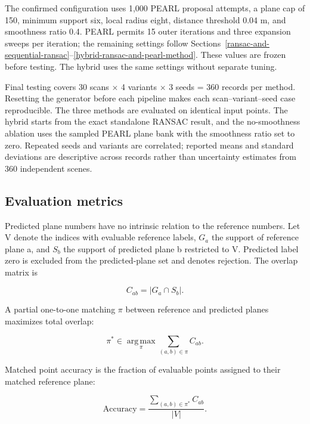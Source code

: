The confirmed configuration uses 1,000 PEARL proposal attempts, a plane cap of 150, minimum support six, local radius eight, distance threshold 0.04 m, and smoothness ratio 0.4. PEARL permits 15 outer iterations and three expansion sweeps per iteration; the remaining settings follow Sections~\ref{ransac-and-sequential-ransac}--\ref{hybrid-ransac-and-pearl-method}. These values are frozen before testing. The hybrid uses the same settings without separate tuning.

Final testing covers 30 scans \(\times\) 4 variants \(\times\) 3 seeds = 360 records per method. Resetting the generator before each pipeline makes each scan--variant--seed case reproducible. The three methods are evaluated on identical input points. The hybrid starts from the exact standalone RANSAC result, and the no-smoothness ablation uses the sampled PEARL plane bank with the smoothness ratio set to zero. Repeated seeds and variants are correlated; reported means and standard deviations are descriptive across records rather than uncertainty estimates from 360 independent scenes.

\subsection{Evaluation metrics}\label{evaluation-metrics}

Predicted plane numbers have no intrinsic relation to the reference numbers. Let V denote the indices with evaluable reference labels, \(G_{a}\) the support of reference plane a, and \(S_{b}\) the support of predicted plane b restricted to V. Predicted label zero is excluded from the predicted-plane set and denotes rejection. The overlap matrix is

\begin{equation}
C_{ab}=|G_a\cap S_b|.
\label{eq:57}
\end{equation}

A partial one-to-one matching \(\pi\) between reference and predicted planes maximizes total overlap:

\begin{equation}
\pi^*\in\operatorname*{arg\,max}_{\pi}\sum_{(a,b)\in\pi}C_{ab}.
\label{eq:58}
\end{equation}

Matched point accuracy is the fraction of evaluable points assigned to their matched reference plane:

\begin{equation}
\mathrm{Accuracy}=\frac{\sum_{(a,b)\in\pi^*}C_{ab}}{|V|}.
\label{eq:59}
\end{equation}

